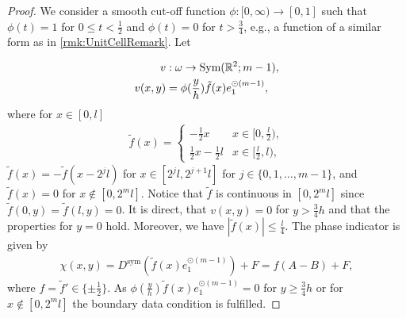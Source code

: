 \documentclass[a4paper, 10pt, twoside, notitlepage]{amsart}
\theoremstyle{plain}
\newcommand{\R}{\mathbb{R}}
\newcommand{\Ds}{D^{\text{sym}}}
\begin{document}
		\begin{proof}
			We consider a smooth cut-off function $\phi: [0,\infty) \to [0,1]$ such that $\phi(t) = 1$ for $0 \leq t < \frac{1}{2}$ and $\phi(t) = 0$ for $t>\frac{3}{4}$, e.g., a function of a similar form as in
			\cref{rmk:UnitCellRemark}.  Let
                        
			\begin{align*}
				v& : \omega \to \textup{Sym}(\R^2;m-1), \\
				v(x,y) & = \phi(\frac{y}{h}) \tilde{f}(x) e_1^{\odot (m-1)},
			\end{align*}
			where for $x \in [0,l]$
			\begin{align*}
                          \tilde{f}(x) = \begin{cases} - \frac{1}{2}x & x \in [0,\frac{l}{2}), \\  \frac{1}{2}x - \frac{1}{2} l & x \in [ \frac{l}{2},l),
                                         \end{cases}
                                               \end{align*}
                                               $\tilde{f}(x) = -\tilde{f}(x-2^jl)$ for $x \in [2^jl,2^{j+1}l]$ for $j\in \{0,1,\dots,m-1\}$, and $\tilde{f}(x) = 0$ for $x \notin [0,2^ml]$.
Notice that $\tilde f$ is continuous in $[0,2^ml]$ since $\tilde f(0,y)=\tilde f(l,y)=0$.
                                               It is direct, that $v(x,y) = 0$ for $y > \frac{3}{4}h$ and that the properties for $y=0$ hold.
                                             Moreover, we have $|\tilde{f}(x)| \leq \frac{l}{4}$.
                                           The phase indicator is given by
                        \begin{align*}
                          \chi(x,y) = \Ds(\tilde{f}(x) e_1^{\odot (m-1)}) \allowbreak + F = f (A-B) + F,
                        \end{align*}
                        where
			$f = \tilde{f}' \in \{\pm \frac{1}{2}\}$.  As $\phi(\frac{y}{h}) \tilde{f}(x) e_1^{\odot(m-1)} = 0$ for $ y \geq \frac{3}{4}h$ or for $x \notin [0,2^ml]$ the boundary data condition is
			fulfilled.
			

\end{proof}
\end{document}
